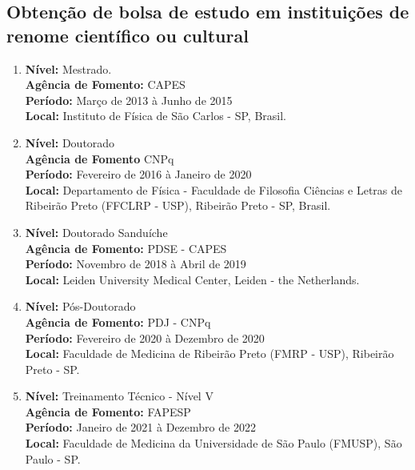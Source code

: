 \documentclass[a4paper,oneside,10pt]{article}
\begin{document}

\subsection{\large{Obtenção  de  bolsa  de  estudo  em  instituições de  renome  científico  ou  cultural}}
\vspace{0.3cm}

\begin{enumerate}
\renewcommand{\labelenumi}{{\large\bfseries\arabic{enumi}.}}

\item   \textbf{Nível:} Mestrado. \mbox{} \\
        \textbf{Agência de Fomento:} CAPES\\
        \textbf{Período:} Março de 2013 à Junho de 2015\\
        \textbf{Local:} Instituto de Física de São Carlos - SP, Brasil.

\item   \textbf{Nível:} Doutorado \mbox{} \\
        \textbf{Agência de Fomento} CNPq \\
        \textbf{Período:} Fevereiro de 2016 à Janeiro de 2020\\
        \textbf{Local:} Departamento de Física - Faculdade de Filosofia Ciências e Letras de Ribeirão Preto (FFCLRP - USP), Ribeirão Preto - SP, Brasil.

\item   \textbf{Nível:} Doutorado Sanduíche \mbox{} \\
        \textbf{Agência de Fomento:} PDSE - CAPES\\
        \textbf{Período:} Novembro de 2018 à Abril de 2019\\
        \textbf{Local:} Leiden University Medical Center, Leiden - the Netherlands. 

\item   \textbf{Nível:} Pós-Doutorado \mbox{} \\
        \textbf{Agência de Fomento:} PDJ - CNPq\\
        \textbf{Período:} Fevereiro de 2020 à Dezembro de 2020\\
        \textbf{Local:} Faculdade de Medicina de Ribeirão Preto (FMRP - USP), Ribeirão Preto - SP.

\item   \textbf{Nível:} Treinamento Técnico - Nível V \mbox{} \\
        \textbf{Agência de Fomento:} FAPESP\\
        \textbf{Período:} Janeiro de 2021 à Dezembro de 2022\\
        \textbf{Local:} Faculdade de Medicina da Universidade de São Paulo (FMUSP), São Paulo - SP.

\end{enumerate}
\end{document}
